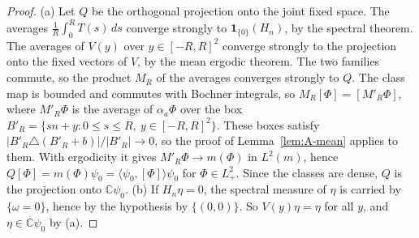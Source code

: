 \documentclass[11pt]{amsart}
\theoremstyle{plain}
\theoremstyle{definition}
\theoremstyle{remark}
\numberwithin{equation}{section}
\newcommand{\C}{\mathbb{C}}
\newcommand{\abs}[1]{\lvert #1\rvert}
\newcommand{\ip}[2]{\langle #1,#2\rangle}
\begin{document}
\begin{proof}
(a) Let $Q$ be the orthogonal projection onto the joint fixed space. The averages $\frac1R\int_0^RT(s)\,ds$ converge strongly to $\mathbf 1_{\{0\}}(H_n)$, by the spectral theorem. The averages of $V(y)$ over $y\in[-R,R]^2$ converge strongly to the projection onto the fixed vectors of $V$, by the mean ergodic theorem. The two families commute, so the product $M_R$ of the averages converges strongly to $Q$. The class map is bounded and commutes with Bochner integrals, so $M_R[\Phi]=[M'_R\Phi]$, where $M'_R\Phi$ is the average of $\alpha_a\Phi$ over the box $B'_R=\{sn+y:0\le s\le R,\ y\in[-R,R]^2\}$. These boxes satisfy $\abs{B'_R\triangle(B'_R+b)}/\abs{B'_R}\to0$, so the proof of Lemma~\ref{lem:A-mean} applies to them. With ergodicity it gives $M'_R\Phi\to m(\Phi)$ in $L^2(m)$, hence $Q[\Phi]=m(\Phi){\psi_0}=\ip{\psi_0}{[\Phi]}{\psi_0}$ for $\Phi\in L^2_+$. Since the classes are dense, $Q$ is the projection onto $\C{\psi_0}$.
(b) If $H_n\eta=0$, the spectral measure of $\eta$ is carried by $\{\omega=0\}$, hence by the hypothesis by $\{(0,0)\}$. So $V(y)\eta=\eta$ for all $y$, and $\eta\in\C{\psi_0}$ by (a).
\end{proof}
\end{document}
